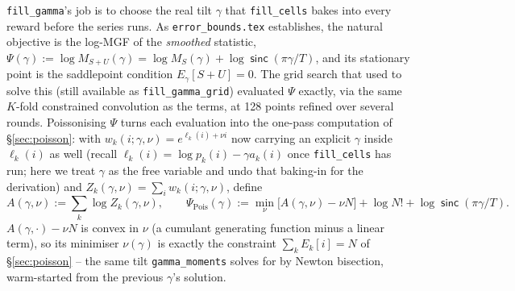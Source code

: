 \documentclass[11pt]{article}
\newcommand{\sinck}{\operatorname{\mathsf{sinc}}}
\begin{document}
\texttt{fill\_gamma}'s job is to choose the real tilt $\gamma$ that \texttt{fill\_cells} bakes into
every reward before the series runs. As \texttt{error\_bounds.tex} establishes, the natural
objective is the log-MGF of the \emph{smoothed} statistic,
$\Psi(\gamma):=\log M_{S+U}(\gamma)=\log M_S(\gamma)+\log\sinck(\pi\gamma/T)$, and its stationary
point is the saddlepoint condition $E_\gamma[S+U]=0$. The grid search that used to solve this
(still available as \texttt{fill\_gamma\_grid}) evaluated $\Psi$ exactly, via the same $K$-fold
constrained convolution as the terms, at 128 points refined over several rounds. Poissonising
$\Psi$ turns each evaluation into the one-pass computation of \S\ref{sec:poisson}: with
$w_k(i;\gamma,\nu)=e^{\ell_k(i)+\nu i}$ now carrying an explicit $\gamma$ inside $\ell_k(i)$ as well
(recall $\ell_k(i)=\log p_k(i)-\gamma a_k(i)$ once \texttt{fill\_cells} has run; here we treat
$\gamma$ as the free variable and undo that baking-in for the derivation) and $Z_k(\gamma,\nu)=\sum_iw_k(i;\gamma,\nu)$,
define
\[
  A(\gamma,\nu):=\sum_k\log Z_k(\gamma,\nu),\qquad
  \Psi_{\mathrm{Pois}}(\gamma):=\min_\nu\big[A(\gamma,\nu)-\nu N\big]+\log N!+\log\sinck(\pi\gamma/T).
\]
$A(\gamma,\cdot)-\nu N$ is convex in $\nu$ (a cumulant generating function minus a linear term), so
its minimiser $\nu(\gamma)$ is exactly the constraint $\sum_kE_k[i]=N$ of \S\ref{sec:poisson} --
the same tilt \texttt{gamma\_moments} solves for by Newton bisection, warm-started from the
previous $\gamma$'s solution.
\end{document}
